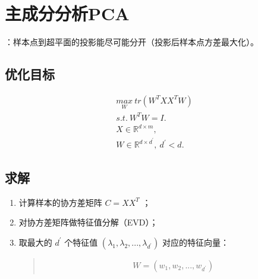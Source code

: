 \documentclass[letterpaper,10pt,english]{sphinxmanual}
\begin{document}
\section{主成分分析PCA}
\label{\detokenize{machineLearning/03_pca:pca}}\label{\detokenize{machineLearning/03_pca::doc}}
 ：样本点到超平面的投影能尽可能分开（投影后样本点方差最大化）。


\subsection{优化目标}
\label{\detokenize{machineLearning/03_pca:id1}}\begin{equation*}
\begin{split}\underset{W}{max} \ tr(W^TXX^TW) \\
s.t. \ W^TW=I. \\
X \in \mathbb{R}^{d \times m}, \\
W \in \mathbb{R}^{d \times d^\prime}, \ d^\prime < d.\end{split}
\end{equation*}

\subsection{求解}
\label{\detokenize{machineLearning/03_pca:id2}}\begin{enumerate}
\item {} 
计算样本的协方差矩阵 \(C = XX^T\) ；

\item {} 
对协方差矩阵做特征值分解（EVD）；

\item {} 
取最大的 \(d^\prime\) 个特征值 \((\lambda_1, \lambda_2,...,\lambda_{d^\prime})\) 对应的特征向量：
\begin{quote}
\begin{equation*}
\begin{split}W = (w_1, w_2,...,w_{d^\prime})\end{split}
\end{equation*}\end{quote}

\end{enumerate}
\end{document}
